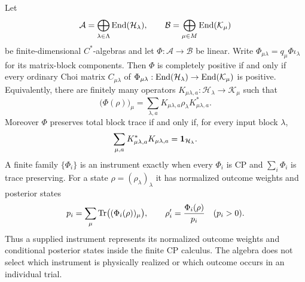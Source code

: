 \documentclass[12pt,a4paper]{article}
\begin{document}
\begin{theorem}
\label{p4:thm:finite-choi-kraus-instruments}
Let
\[
\mathcal A=\bigoplus_{\lambda\in\Lambda}\operatorname{End}(\mathcal H_\lambda),
\qquad
\mathcal B=\bigoplus_{\mu\in M}\operatorname{End}(\mathcal K_\mu)
\]
be finite-dimensional \(C^*\)-algebras and let
\(\Phi:\mathcal A\to\mathcal B\) be linear.  Write
\(\Phi_{\mu\lambda}=q_\mu\Phi\iota_\lambda\) for its matrix-block
components.  Then \(\Phi\) is completely positive if and only if every
ordinary Choi matrix \(C_{\mu\lambda}\) of
\(\Phi_{\mu\lambda}:\operatorname{End}(\mathcal H_\lambda)\to
\operatorname{End}(\mathcal K_\mu)\) is positive.  Equivalently, there are finitely many
operators
\(K_{\mu\lambda,a}:\mathcal H_\lambda\to\mathcal K_\mu\) such that
\begin{equation}
\label{p4:eq:kraus}
\bigl(\Phi(\rho)\bigr)_\mu
=\sum_{\lambda,a}
K_{\mu\lambda,a}\rho_\lambda K_{\mu\lambda,a}^*.
\end{equation}
Moreover \(\Phi\) preserves total block trace if and only if, for every
input block \(\lambda\),
\begin{equation}
\label{p4:eq:kraus-tp}
\sum_{\mu,a}K_{\mu\lambda,a}^*K_{\mu\lambda,a}
=\mathbf{1}_{\mathcal H_\lambda} .
\end{equation}
A finite family \(\{\Phi_i\}\) is an instrument exactly when every
\(\Phi_i\) is CP and \(\sum_i\Phi_i\) is trace preserving.  For a state
\(\rho=(\rho_\lambda)_\lambda\) it has normalized outcome weights and
posterior states
\begin{equation}
\label{p4:eq:instrument}
p_i=\sum_\mu\operatorname{Tr}\bigl((\Phi_i(\rho))_\mu\bigr),
\qquad
\rho_i'=\frac{\Phi_i(\rho)}{p_i}
\quad (p_i>0).
\end{equation}
Thus a supplied instrument represents its normalized outcome weights and
conditional posterior states inside the finite CP calculus.  The algebra
does not select which instrument is physically realized or which outcome
occurs in an individual trial.
\end{theorem}
\end{document}
